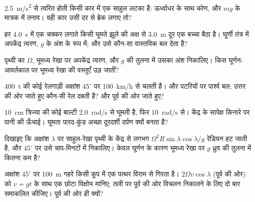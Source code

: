 \begin{exercise}[$\star$]\label{exo:b1:non-inertial-frames:1}
\qty{2.5}{m/s^2} से त्वरित होती किसी कार में एक साहुल लटका है: ऊर्ध्वाधर के
साथ कोण, और $mg$ के मात्रक में तनाव। वही कार उसी दर से ब्रेक लगाए तो?
\end{exercise}

\begin{exercise}[$\star$]\label{exo:b1:non-inertial-frames:2}
हर \qty{4.0}{s} में एक चक्कर लगाते किसी घूमते झूले की अक्ष से \qty{3.0}{m}
दूर एक बच्चा बैठा है। घूर्णी तंत्र में अपकेंद्र त्वरण, $g$ के अंश के रूप
में; और उसे कौन-सा वास्तविक बल देता है?
\end{exercise}

\begin{exercise}[$\star$]\label{exo:b1:non-inertial-frames:3}
पृथ्वी का  $\Omega$, भूमध्य रेखा पर अपकेंद्र त्वरण, और $g$ की
तुलना में उसका अंश निकालिए। किस घूर्णन-आवर्तकाल पर भूमध्य रेखा की वस्तुएँ
उड़ जातीं?
\end{exercise}

\begin{exercise}[$\star$]\label{exo:b1:non-inertial-frames:4}
\qty{400}{t} की कोई रेलगाड़ी अक्षांश $45^\circ$ पर \qty{100}{km/h} से चलती
है।  और पटरियों पर पार्श्व बल; उत्तर की ओर जाते हुए कौन-सी
रेल दबती है? और पूर्व की ओर जाते हुए?
\end{exercise}

\begin{exercise}[$\star\star$]\label{exo:b1:non-inertial-frames:5}
\qty{10}{cm} त्रिज्या की कोई बाल्टी \qty{2.0}{rad/s} से घूमती है, फिर
\qty{10}{rad/s} से। केंद्र के सापेक्ष किनारे पर पानी की ऊँचाई।
घूमता पारद-कुंड अच्छा दूरदर्शी दर्पण क्यों बनता है?
\end{exercise}

\begin{exercise}[$\star\star$]\label{exo:b1:non-inertial-frames:6}
दिखाइए कि अक्षांश $\lambda$ पर साहुल-रेखा पृथ्वी के केंद्र से लगभग
$\Omega^2R\sin\lambda\cos\lambda/g$ रेडियन हट जाती है, और $45^\circ$ पर उसे
चाप-मिनटों में निकालिए। केवल घूर्णन के कारण भूमध्य रेखा पर $g$ ध्रुव की
तुलना में कितना कम है?
\end{exercise}

\begin{exercise}[$\star\star$]\label{exo:b1:non-inertial-frames:7}
अक्षांश $45^\circ$ पर \qty{100}{m} गहरे किसी कूप में एक पत्थर विराम से
गिरता है।  $2\Omega v\cos\lambda$ (पूर्व की ओर) को
$v = gt$ के साथ एक छोटा विक्षोभ मानिए; तली पर पूर्व की ओर विचलन निकालने के
लिए दो बार समाकलित कीजिए। पूर्व की ओर ही क्यों?
\end{exercise}

